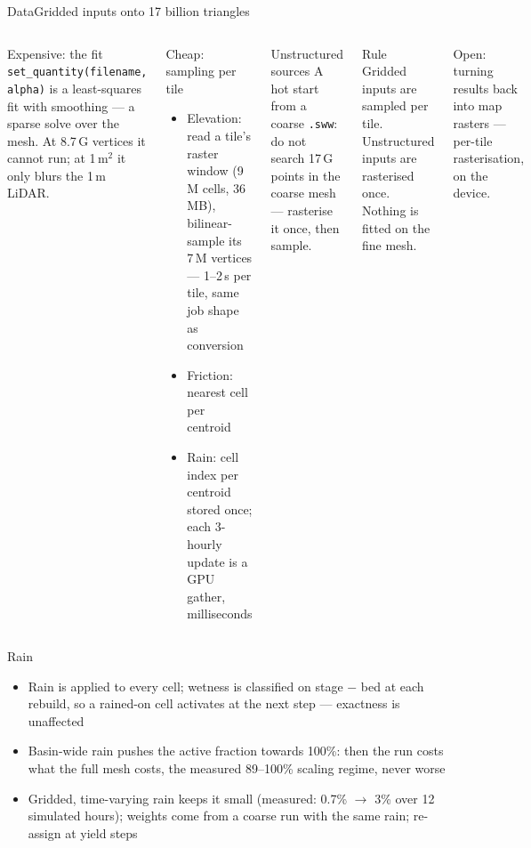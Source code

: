 \documentclass[aspectratio=169]{beamer}
\newcommand{\muted}[1]{{\footnotesize\color{cookieMuted}#1}}
\begin{document}
\begin{frame}{Data}{Gridded inputs onto 17 billion triangles}
  \footnotesize
  \begin{columns}[T,onlytextwidth]
      \begin{block}{Expensive: the fit}
        \texttt{set\_quantity(filename, alpha)} is a least-squares fit with smoothing --- a sparse solve over the mesh. At 8.7\,G vertices it cannot run; at 1\,m$^2$ it only blurs the 1\,m LiDAR.
      \end{block}
      \begin{block}{Cheap: sampling per tile}
        \begin{itemize}
          \item Elevation: read a tile's raster window (9\,M cells, 36\,MB), bilinear-sample its 7\,M vertices --- 1--2\,s per tile, same job shape as conversion
          \item Friction: nearest cell per centroid
          \item Rain: cell index per centroid stored once; each 3-hourly update is a GPU gather, milliseconds
        \end{itemize}
      \end{block}
      \begin{block}{Unstructured sources}
        A hot start from a coarse \texttt{.sww}: do not search 17\,G points in the coarse mesh --- rasterise it once, then sample.
      \end{block}
      \begin{block}{Rule}
        Gridded inputs are sampled per tile. Unstructured inputs are rasterised once. Nothing is fitted on the fine mesh.
      \end{block}
      \muted{Open: turning results back into map rasters --- per-tile rasterisation, on the device.}
  \end{columns}
\end{frame}

\begin{frame}{Rain}
  \begin{itemize}\setlength\itemsep{6pt}
    \item Rain is applied to every cell; wetness is classified on stage $-$ bed at each rebuild, so a rained-on cell activates at the next step --- exactness is unaffected
    \item Basin-wide rain pushes the active fraction towards 100\%: then the run costs what the full mesh costs, the measured 89--100\% scaling regime, never worse
    \item Gridded, time-varying rain keeps it small \muted{(measured: 0.7\% $\to$ 3\% over 12 simulated hours)}; weights come from a coarse run with the same rain; re-assign at yield steps
  \end{itemize}
\end{frame}
\end{document}
